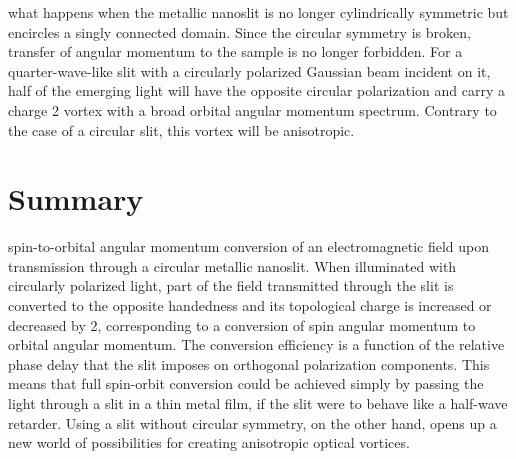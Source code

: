  what happens when the metallic nanoslit is no longer cylindrically symmetric but encircles a singly connected domain. Since the circular symmetry is broken, transfer of angular momentum to the sample is no longer forbidden. For a quarter-wave-like slit with a circularly polarized Gaussian beam incident on it, half of the emerging light will have the opposite circular polarization and carry a charge 2 vortex with a broad orbital angular momentum spectrum. Contrary to the case of a circular slit, this vortex will be anisotropic.

\section{Summary}

 spin-to-orbital angular momentum conversion of an electromagnetic field upon transmission through a circular metallic nanoslit. When illuminated with circularly polarized light, part of the field transmitted through the slit is converted to the opposite handedness and its topological charge is increased or decreased by 2, corresponding to a conversion of spin angular momentum to orbital angular momentum. The conversion efficiency is a function of the relative phase delay that the slit imposes on orthogonal polarization components. This means that full spin-orbit conversion could be achieved simply by passing the light through a slit in a thin metal film, if the slit were to behave like a half-wave retarder. Using a slit without circular symmetry, on the other hand, opens up a new world of possibilities for creating anisotropic optical vortices.
